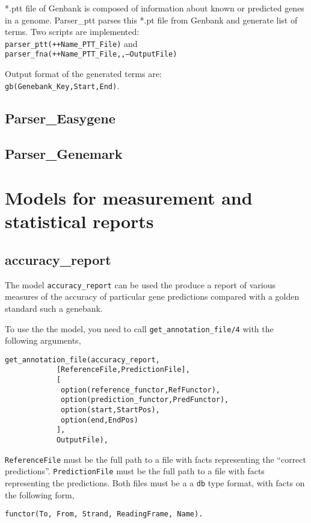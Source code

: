 \documentclass{book}
\begin{document}
*.ptt file of Genbank is composed of information about known or predicted
genes in a genome. Parser\_ptt parses this *.pt file from Genbank and generate
list of terms. Two scripts are implemented:\\ 
\texttt{parser\_ptt(++Name\_PTT\_File)} and \\
\texttt{parser\_fna(++Name\_PTT\_File,,--OutputFile)}

Output format of the generated terms are:\\
\texttt{gb(Genebank\_Key,Start,End)}.

\subsection{Parser\_Easygene}

\subsection{Parser\_Genemark}

\section{Models for measurement and statistical reports}

\subsection{accuracy\_report}

The model \texttt{accuracy\_report} can be used the produce a report of
various measures of the accuracy of particular gene predictions
compared with a golden standard such a genebank. 

To use the the model, you need to call
\texttt{get\_annotation\_file/4} with the following arguments,
\begin{verbatim}
get_annotation_file(accuracy_report,
		    [ReferenceFile,PredictionFile],
		    [
		     option(reference_functor,RefFunctor),
		     option(prediction_functor,PredFunctor),
		     option(start,StartPos),
		     option(end,EndPos)
		    ],
		    OutputFile),
\end{verbatim}

\texttt{ReferenceFile} must be the full path to a file with facts
representing the ``correct predictions''.  
\texttt{PredictionFile} must be the full path to a file with facts
representing the predictions. Both files must be a a \texttt{db} type 
format, with facts on the following form,
\begin{verbatim}
functor(To, From, Strand, ReadingFrame, Name).
\end{verbatim}
\end{document}
